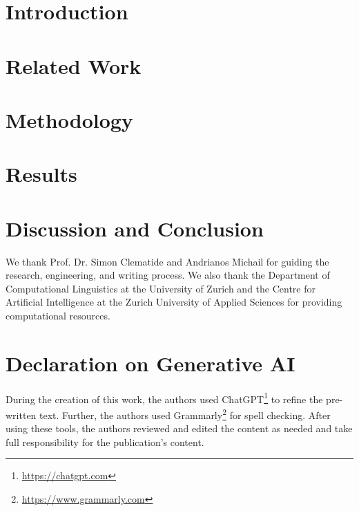 \documentclass[
]{ceurart}
\begin{document}
\maketitle

\section{Introduction}



\section{Related Work}


\section{Methodology}



\section{Results} \label{sec:results}



\section{Discussion and Conclusion}


\begin{acknowledgments}
  We thank Prof. Dr. Simon Clematide and Andrianos Michail for guiding the research, engineering, and writing process.
  We also thank the Department of Computational Linguistics at the University of Zurich and the Centre for Artificial Intelligence at the Zurich University of Applied Sciences for providing computational resources.
\end{acknowledgments}

\section*{Declaration on Generative AI}
\noindent During the creation of this work, the authors used ChatGPT\footnote{\url{https://chatgpt.com}} to refine the pre-written text. Further, the authors used Grammarly\footnote{\url{https://www.grammarly.com}} for spell checking.
 After using these tools, the authors reviewed and edited the content as needed and take full responsibility for the publication’s content. 



\appendix

\end{document}
